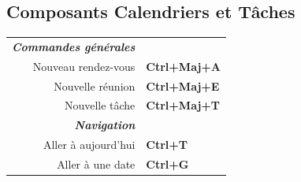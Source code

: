 \documentclass[12pt]{article}
\begin{document}
\begin{landscape}
\begin{center}
\begin{multicols}{2}
	\section*{Composants Calendriers et Tâches}
	\begin{tabular*}{4in}{rp{1.5in}}
		\textit{\textbf{Commandes générales}}	&					\\
		Nouveau rendez-vous				& \textbf{Ctrl+Maj+A}			\\
		Nouvelle réunion				& \textbf{Ctrl+Maj+E}			\\
		\vspace{1.5mm}
		Nouvelle tâche				& \textbf{Ctrl+Maj+T}			\\
		\textit{\textbf{Navigation}}		&					\\
		Aller à aujourd'hui			& \textbf{Ctrl+T}			\\
		Aller à une date				& \textbf{Ctrl+G}			\\
	\end{tabular*}
	\end{multicols}
	\end{center}
	\end{landscape}
 
\end{document}

